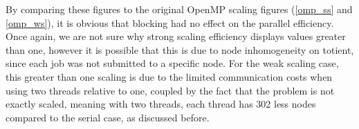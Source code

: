 \documentclass[11pt]{article}
\begin{document}
\noindent By comparing these figures to the original OpenMP scaling figures (\ref{omp_ss} and \ref{omp_ws}), it is obvious that blocking had no effect on the parallel efficiency. Once again, we are not sure why strong scaling efficiency displays values greater than one, however it is possible that this is due to node inhomogeneity on totient, since each job was not submitted to a specific node. For the weak scaling case, this greater than one scaling is due to the limited communication costs when using two threads relative to one, coupled by the fact that the problem is not exactly scaled, meaning with two threads, each thread has 302 less nodes compared to the serial case, as discussed before. 
\end{document}
